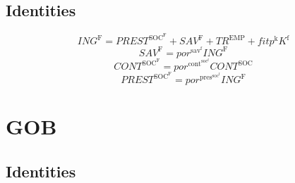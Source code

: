 \subsection{Identities}

\begin{equation}
{I\!N\!G}^{\mathrm{F}} = {P\!R\!E\!S\!T}^{\mathrm{SOC}^{\mathrm{F}}} + {S\!A\!V}^{\mathrm{F}} + {T\!R}^{\mathrm{EMP}} + {{f\!i\!t}} {p^{\mathrm{k}}} {K^{\mathrm{f}}}
\end{equation}
\begin{equation}
{S\!A\!V}^{\mathrm{F}} = {{p\!o\!r}^{\mathrm{sav}^{\mathrm{f}}}} {{I\!N\!G}^{\mathrm{F}}}
\end{equation}
\begin{equation}
{C\!O\!N\!T}^{\mathrm{SOC}^{\mathrm{F}}} = {{p\!o\!r}^{\mathrm{cont}^{\mathrm{soc}^{\mathrm{f}}}}} {{C\!O\!N\!T}^{\mathrm{SOC}}}
\end{equation}
\begin{equation}
{P\!R\!E\!S\!T}^{\mathrm{SOC}^{\mathrm{F}}} = {{p\!o\!r}^{\mathrm{pres}^{\mathrm{soc}^{\mathrm{f}}}}} {{I\!N\!G}^{\mathrm{F}}}
\end{equation}




\section{GOB}

\subsection{Identities}

